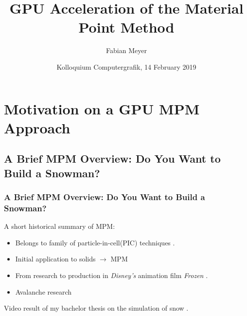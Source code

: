 \documentclass{beamer}
\title{GPU Acceleration of the Material Point Method}
\author %
{Fabian Meyer}
\institute %
{University of Koblenz}
\date{Kolloquium Computergrafik, 14 February 2019}
\let\oldcite=\cite
\renewcommand{\cite}[1]{\textcolor[rgb]{.55,.55,.89}{\oldcite{#1}}}
\begin{document}
\begin{frame}
\titlepage
\end{frame}

\section{Motivation on a GPU MPM Approach}

\subsection{A Brief MPM Overview: Do You Want to Build a Snowman?}

\begin{frame}

\frametitle{A Brief MPM Overview: Do You Want to Build a Snowman?}
A short historical summary of MPM:
\vfill
\begin{minipage}{0.43\paperwidth}
  \begin{itemize}
    \item Belongs to family of particle-in-cell(PIC) techniques \cite{evans1957particle}.
    \item Initial application to solids \cite{sulsky1995application} $\rightarrow$ MPM
    \item From research to production in \textit{Disney's} animation film \textit{Frozen} \cite{MPM:SNOW}.
    \item Avalanche research \cite{MPM:AVALANCHE}
  \end{itemize}
\end{minipage}
\begin{minipage}{0.35\paperwidth}
  \tiny{Video result of my bachelor thesis on the simulation of snow \cite{Meyer2015}.}
\end{minipage}
\end{frame}
\end{document}
